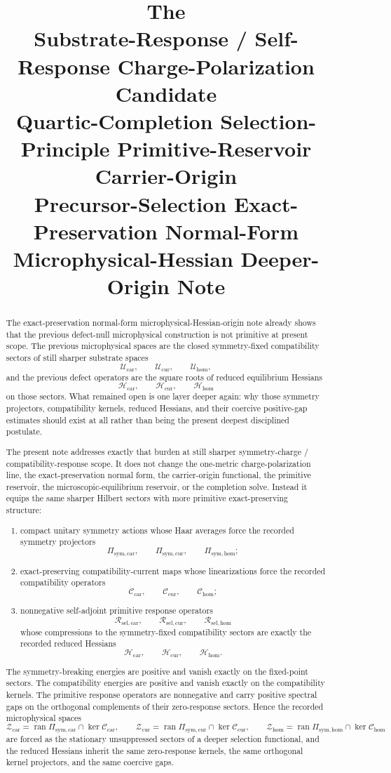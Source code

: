 \documentclass[11pt]{article}
\title{\textbf{The \TheoryName{}}\\[0.4em]
\large Substrate-Response / Self-Response Charge-Polarization Candidate\\
\large Quartic-Completion Selection-Principle Primitive-Reservoir Carrier-Origin\\
\large Precursor-Selection Exact-Preservation Normal-Form Microphysical-Hessian Deeper-Origin Note}
\author{}
\date{}
\newcommand{\UltraTensorClass}{\mathscr Z_{\mathrm{car}}}
\newcommand{\UltraRelabelClass}{\mathscr Z_{\mathrm{cur}}}
\newcommand{\UltraFreeClass}{\mathscr Z_{\mathrm{hom}}}
\newcommand{\RootTensorClass}{\mathscr U_{\mathrm{car}}}
\newcommand{\RootRelabelClass}{\mathscr U_{\mathrm{cur}}}
\newcommand{\RootFreeClass}{\mathscr U_{\mathrm{hom}}}
\newcommand{\TensorSymProj}{\Pi_{\mathrm{sym,car}}}
\newcommand{\CurSymProj}{\Pi_{\mathrm{sym,cur}}}
\newcommand{\HomSymProj}{\Pi_{\mathrm{sym,hom}}}
\newcommand{\TensorCompat}{\mathcal C_{\mathrm{car}}}
\newcommand{\CurCompat}{\mathcal C_{\mathrm{cur}}}
\newcommand{\HomCompat}{\mathcal C_{\mathrm{hom}}}
\newcommand{\TensorHess}{\mathcal H_{\mathrm{car}}}
\newcommand{\CurHess}{\mathcal H_{\mathrm{cur}}}
\newcommand{\HomHess}{\mathcal H_{\mathrm{hom}}}
\newcommand{\TensorResp}{\mathcal R_{\mathrm{sel,car}}}
\newcommand{\CurResp}{\mathcal R_{\mathrm{sel,cur}}}
\newcommand{\HomResp}{\mathcal R_{\mathrm{sel,hom}}}
\begin{document}
\maketitle

\begin{abstract}
The exact-preservation normal-form microphysical-Hessian-origin note already shows that the previous defect-null microphysical construction is not primitive at present scope. The previous microphysical spaces are the closed symmetry-fixed compatibility sectors of still sharper substrate spaces
\[
\RootTensorClass,\qquad
\RootRelabelClass,\qquad
\RootFreeClass,
\]
and the previous defect operators are the square roots of reduced equilibrium Hessians
\[
\TensorHess,\qquad
\CurHess,\qquad
\HomHess
\]
on those sectors. What remained open is one layer deeper again: why those symmetry projectors, compatibility kernels, reduced Hessians, and their coercive positive-gap estimates should exist at all rather than being the present deepest disciplined postulate.

The present note addresses exactly that burden at still sharper symmetry-charge / compatibility-response scope. It does not change the one-metric charge-polarization line, the exact-preservation normal form, the carrier-origin functional, the primitive reservoir, the microscopic-equilibrium reservoir, or the completion solve. Instead it equips the same sharper Hilbert sectors with more primitive exact-preserving structure:
\begin{enumerate}
    \item compact unitary symmetry actions whose Haar averages force the recorded symmetry projectors
    \[
    \TensorSymProj,\qquad
    \CurSymProj,\qquad
    \HomSymProj;
    \]
    \item exact-preserving compatibility-current maps whose linearizations force the recorded compatibility operators
    \[
    \TensorCompat,\qquad
    \CurCompat,\qquad
    \HomCompat;
    \]
    \item nonnegative self-adjoint primitive response operators
    \[
    \TensorResp,\qquad
    \CurResp,\qquad
    \HomResp
    \]
    whose compressions to the symmetry-fixed compatibility sectors are exactly the recorded reduced Hessians
    \[
    \TensorHess,\qquad
    \CurHess,\qquad
    \HomHess.
    \]
\end{enumerate}
The symmetry-breaking energies are positive and vanish exactly on the fixed-point sectors. The compatibility energies are positive and vanish exactly on the compatibility kernels. The primitive response operators are nonnegative and carry positive spectral gaps on the orthogonal complements of their zero-response sectors. Hence the recorded microphysical spaces
\[
\UltraTensorClass=\operatorname{ran}\TensorSymProj\cap\ker\TensorCompat,\qquad
\UltraRelabelClass=\operatorname{ran}\CurSymProj\cap\ker\CurCompat,\qquad
\UltraFreeClass=\operatorname{ran}\HomSymProj\cap\ker\HomCompat
\]
are forced as the stationary unsuppressed sectors of a deeper selection functional, and the reduced Hessians inherit the same zero-response kernels, the same orthogonal kernel projectors, and the same coercive gaps.


\end{abstract}
\end{document}
